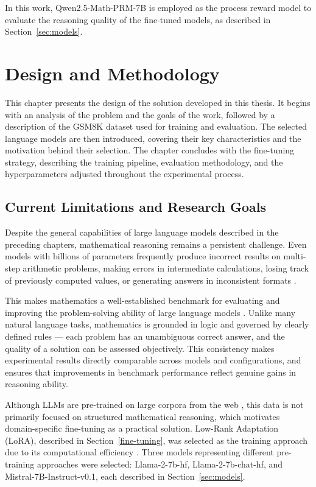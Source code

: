  In this work,
  Qwen2.5-Math-PRM-7B is employed as the process reward
  model to evaluate the reasoning quality of the
  fine-tuned models, as described in
  Section~\ref{sec:models}.

\chapter{Design and Methodology}
\label{chap:design}
This chapter presents the design of the solution
  developed in this thesis. It begins with an
  analysis of the problem and the goals of the
  work, followed by a description of the GSM8K
  dataset used for training and evaluation. The
  selected language models are then introduced,
  covering their key characteristics and the
  motivation behind their selection. The chapter
  concludes with the fine-tuning strategy,
  describing the training pipeline, evaluation
  methodology, and the hyperparameters adjusted
  throughout the experimental process.
\section{Current Limitations and Research Goals}
\label{sec:problem-analysis}


  Despite the general capabilities of large
  language models described in the preceding
  chapters, mathematical reasoning remains a
  persistent challenge. Even models with billions of
  parameters frequently produce incorrect results on multi-step
  arithmetic problems, making errors in intermediate calculations,
  losing track of previously computed values, or generating answers
  in inconsistent formats \cite{cobbe2021}.

  This makes mathematics a well-established benchmark
  for evaluating and improving the
  problem-solving ability of large language
  models \cite{hendrycks2021}. Unlike many natural language tasks,
  mathematics is grounded in logic and governed by clearly defined
  rules --- each problem has an unambiguous correct answer, and the
  quality of a solution can be assessed objectively. This consistency
  makes experimental results directly comparable across models and
  configurations, and ensures that improvements in benchmark
  performance reflect genuine gains in reasoning ability.

  Although LLMs are pre-trained on large corpora
  from the web \cite{raiaan2024}, this data is
  not primarily focused on structured mathematical
  reasoning, which motivates domain-specific
  fine-tuning as a practical solution.
  Low-Rank Adaptation (LoRA), described in
  Section~\ref{fine-tuning}, was selected as
  the training approach due to its computational
  efficiency \cite{hu2022lora}. Three models
  representing different pre-training approaches
  were selected: Llama-2-7b-hf,
  Llama-2-7b-chat-hf, and
  Mistral-7B-Instruct-v0.1, each described in
  Section~\ref{sec:models}.


